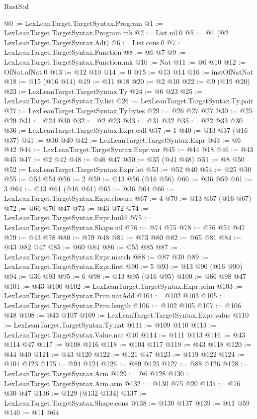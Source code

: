 \begin{lexlean}{RustStd}
\begin{coremodule}
@0 := LexLeanTarget.TargetSyntax.Program
@1 := LexLeanTarget.TargetSyntax.Program.mk
@2 := List.nil.{0}
@5 := @1 (@2 LexLeanTarget.TargetSyntax.Adt)
@6 := List.cons.{0}
@7 := LexLeanTarget.TargetSyntax.Function
@8 := @6 @7
@9 := LexLeanTarget.TargetSyntax.Function.mk
@10 := Nat
@11 := @6 @10
@12 := OfNat.ofNat.{0}
@13 := @12 @10
@14 := 0
@15 := @13 @14
@16 := instOfNatNat
@18 := @15 (@16 @14)
@19 := @11 @18
@20 := @2 @10
@22 := @9 (@19 @20)
@23 := LexLeanTarget.TargetSyntax.Ty
@24 := @6 @23
@25 := LexLeanTarget.TargetSyntax.Ty.list
@26 := LexLeanTarget.TargetSyntax.Ty.pair
@27 := LexLeanTarget.TargetSyntax.Ty.bytes
@29 := @26 @27 @27
@30 := @25 @29
@31 := @24 @30
@32 := @2 @23
@33 := @31 @32
@35 := @22 @33 @30
@36 := LexLeanTarget.TargetSyntax.Expr.call
@37 := 1
@40 := @13 @37 (@16 @37)
@41 := @36 @40
@42 := LexLeanTarget.TargetSyntax.Expr
@43 := @6 @42
@44 := LexLeanTarget.TargetSyntax.Expr.var
@45 := @44 @18
@46 := @43 @45
@47 := @2 @42
@48 := @46 @47
@50 := @35 (@41 @48)
@51 := @8 @50
@52 := LexLeanTarget.TargetSyntax.Expr.let
@53 := @52 @40
@54 := @25 @30
@55 := @53 @54
@56 := 2
@59 := @13 @56 (@16 @56)
@60 := @36 @59
@61 := 3
@64 := @13 @61 (@16 @61)
@65 := @36 @64
@66 := LexLeanTarget.TargetSyntax.Expr.closure
@67 := 4
@70 := @13 @67 (@16 @67)
@72 := @66 @70 @47
@73 := @43 @72
@74 := LexLeanTarget.TargetSyntax.Expr.build
@75 := LexLeanTarget.TargetSyntax.Shape.nil
@76 := @74 @75
@78 := @76 @54 @47
@79 := @43 @78
@80 := @79 @48
@81 := @73 @80
@82 := @65 @81
@84 := @43 @82 @47
@85 := @60 @84
@86 := @55 @85
@87 := LexLeanTarget.TargetSyntax.Expr.match
@88 := @87 @30
@89 := LexLeanTarget.TargetSyntax.Expr.first
@90 := 5
@93 := @13 @90 (@16 @90)
@94 := @36 @93
@95 := 6
@98 := @13 @95 (@16 @95)
@100 := @66 @98 @47
@101 := @43 @100
@102 := LexLeanTarget.TargetSyntax.Expr.prim
@103 := LexLeanTarget.TargetSyntax.Prim.natAdd
@104 := @102 @103
@105 := LexLeanTarget.TargetSyntax.Prim.length
@106 := @102 @105
@107 := @106 @48
@108 := @43 @107
@109 := LexLeanTarget.TargetSyntax.Expr.value
@110 := LexLeanTarget.TargetSyntax.Ty.nat
@111 := @109 @110
@113 := LexLeanTarget.TargetSyntax.Value.nat @40
@114 := @111 @113
@116 := @43 @114 @47
@117 := @108 @116
@118 := @104 @117
@119 := @43 @118
@120 := @44 @40
@121 := @43 @120
@122 := @121 @47
@123 := @119 @122
@124 := @101 @123
@125 := @94 @124
@126 := @89 @125
@127 := @88 @126
@128 := LexLeanTarget.TargetSyntax.Arm
@129 := @6 @128
@130 := LexLeanTarget.TargetSyntax.Arm.arm
@132 := @130 @75 @20
@134 := @76 @30 @47
@136 := @129 (@132 @134)
@137 := LexLeanTarget.TargetSyntax.Shape.cons
@138 := @130 @137
@139 := @11 @59
@140 := @11 @64

\end{coremodule}
\end{lexlean}
